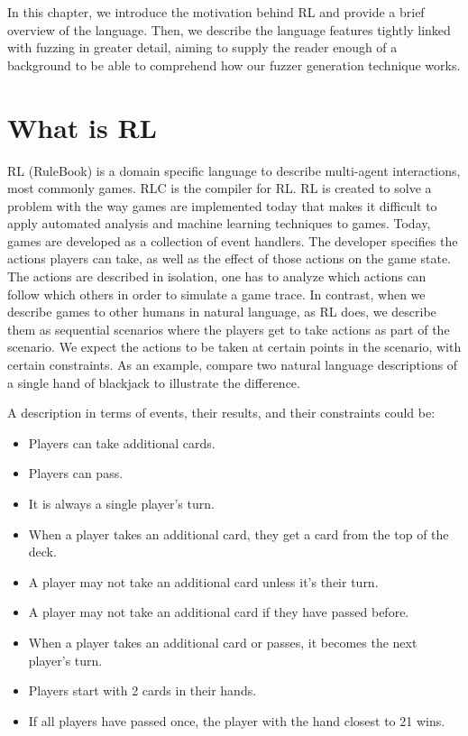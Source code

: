 In this chapter, we introduce the motivation behind RL and provide a brief overview of the language.
Then, we describe the language features tightly linked with fuzzing in greater detail, aiming to supply the reader enough of a background to 
be able to comprehend how our fuzzer generation technique works.

\section{What is RL}
RL (RuleBook) is a domain specific language to describe multi-agent interactions, most commonly games.
RLC is the compiler for RL. RL is created to solve a problem with the way games are implemented today that makes it difficult to apply automated analysis and machine learning techniques to games.
Today, games are developed as a collection of event handlers.
The developer specifies the actions players can take, as well as the effect of those actions on the game state.
The actions are described in isolation, one has to analyze which actions can follow which others in order to simulate a game trace.
In contrast, when we describe games to other humans in natural language, as RL does, we describe them as sequential scenarios where the players get to take actions as part of the scenario.
We expect the actions to be taken at certain points in the scenario, with certain constraints.
As an example, compare two natural language descriptions of a single hand of blackjack to illustrate the difference.

A description in terms of events, their results, and their constraints could be:
\begin{itemize}
    \item Players can take additional cards.
    \item Players can pass.
    \item It is always a single player’s turn.
    \item When a player takes an additional card, they get a card from the top of the deck.
    \item A player may not take an additional card unless it’s their turn.
    \item A player may not take an additional card if they have passed before.
    \item When a player takes an additional card or passes, it becomes the next player’s turn.
    \item Players start with 2 cards in their hands.
    \item If all players have passed once, the player with the hand closest to 21 wins.
\end{itemize}

